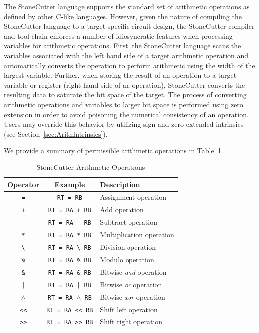 \documentclass{article}
\begin{document}
The StoneCutter language supports the standard set of arithmetic operations as defined 
by other C-like languages.  However, given the nature of compiling the StoneCutter language 
to a target-specific circuit design, the StoneCutter compiler and tool chain enforces a number 
of idiosyncratic features when processing variables for arithmetic operations.  First, the StoneCutter 
language scans the variables associated with the left hand side of a target arithmetic operation and automatically 
converts the operation to perform arithmetic using the width of the largest variable.  Further, when 
storing the result of an operation to a target variable or register (right hand side of an operation), StoneCutter 
converts the resulting data to saturate the bit space of the target.  The process of converting 
arithmetic operations and variables to larger bit space is performed using zero extension in order to avoid 
poisoning the numerical consistency of an operation.  Users may override this behavior by utilizing 
sign and zero extended intrinsics (see Section~\ref{sec:ArithIntrinsics}).

We provide a summary of permissible arithmetic operations in Table~\ref{tab:arithops}.   

\begin{table}[h]
\begin{center}
\caption{StoneCutter Arithmetic Operations}
\vspace{0.125in}
\label{tab:arithops}
\begin{tabular}{|c|c|l|}
\hline
\textbf{Operator} & \textbf{Example} & \textbf{Description}\\
\hline
\texttt{=} & \texttt{RT = RB} & Assignment operation\\
\hline
\texttt{+} & \texttt{RT = RA + RB} & Add operation\\
\hline
\texttt{-} & \texttt{RT = RA - RB} & Subtract operation\\
\hline
\texttt{*} & \texttt{RT = RA * RB} & Multiplication operation\\
\hline
\texttt{\textbackslash} & \texttt{RT = RA \textbackslash~RB} & Division operation\\
\hline
\texttt{\%} & \texttt{RT = RA \% RB} & Modulo operation\\
\hline
\texttt{\&} & \texttt{RT = RA \& RB} & Bitwise \textit{and} operation\\
\hline
\texttt{|} & \texttt{RT = RA | RB} & Bitwise \textit{or} operation\\
\hline
\texttt{$\wedge$} & \texttt{RT = RA $\wedge$ RB} & Bitwise \textit{xor} operation\\
\hline
\texttt{<<} & \texttt{RT = RA << RB} & Shift left operation\\
\hline
\texttt{>>} & \texttt{RT = RA >> RB} & Shift right operation\\
\hline
\end{tabular}
\end{center}
\end{table}
\end{document}
